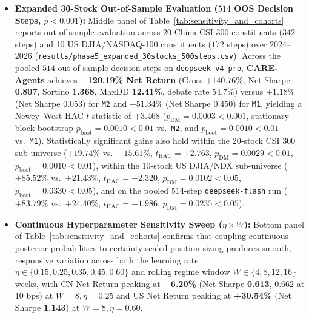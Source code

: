 \documentclass[10pt,a4paper,twocolumn]{article}
\begin{document}
\begin{itemize}
  \item \textbf{Expanded 30-Stock Out-of-Sample Evaluation ($514$ OOS Decision Steps, $p < 0.001$):} Middle panel of Table~\ref{tab:sensitivity_and_cohorts} reports out-of-sample evaluation across 20 China CSI 300 constituents ($342$ steps) and 10 US DJIA/NASDAQ-100 constituents ($172$ steps) over 2024--2026 (\texttt{results/phase5\_expanded\_30stocks\_500steps.csv}). Across the pooled $514$ out-of-sample decision steps on \texttt{deepseek-v4-pro}, \textbf{CARE-Agents} achieves \textbf{+120.19\% Net Return} (Gross $+140.76\%$, Net Sharpe \textbf{0.807}, Sortino \textbf{1.368}, MaxDD \textbf{12.41\%}, debate rate $54.7\%$) versus $+1.18\%$ (Net Sharpe $0.053$) for \texttt{M2} and $+51.34\%$ (Net Sharpe $0.450$) for \texttt{M1}, yielding a Newey--West HAC $t$-statistic of \textbf{$+3.468$} (\textbf{$p_{\text{DM}} = 0.0003 < 0.001$}, stationary block-bootstrap \textbf{$p_{\text{boot}} = 0.0010 < 0.01$} vs.\ \texttt{M2}, and \textbf{$p_{\text{boot}} = 0.0010 < 0.01$} vs.\ \texttt{M1}). Statistically significant gains also hold within the 20-stock CSI 300 sub-universe ($+19.74\%$ vs.\ $-15.61\%$, $t_{\text{HAC}} = +2.763$, $p_{\text{DM}} = 0.0029 < 0.01$, $p_{\text{boot}} = 0.0010 < 0.01$), within the 10-stock US DJIA/NDX sub-universe ($+85.52\%$ vs.\ $+21.43\%$, $t_{\text{HAC}} = +2.320$, $p_{\text{DM}} = 0.0102 < 0.05$, $p_{\text{boot}} = 0.0330 < 0.05$), and on the pooled $514$-step \texttt{deepseek-flash} run ($+83.79\%$ vs.\ $+24.40\%$, $t_{\text{HAC}} = +1.986$, $p_{\text{DM}} = 0.0235 < 0.05$).
  \item \textbf{Continuous Hyperparameter Sensitivity Sweep ($\eta \times W$):} Bottom panel of Table~\ref{tab:sensitivity_and_cohorts} confirms that coupling continuous posterior probabilities to certainty-scaled position sizing produces smooth, responsive variation across both the learning rate $\eta \in \{0.15, 0.25, 0.35, 0.45, 0.60\}$ and rolling regime window $W \in \{4, 8, 12, 16\}$ weeks, with CN Net Return peaking at \textbf{+6.20\%} (Net Sharpe \textbf{0.613}, $0.662$ at 10 bps) at $W=8, \eta=0.25$ and US Net Return peaking at \textbf{+30.54\%} (Net Sharpe \textbf{1.143}) at $W=8, \eta=0.60$.
\end{itemize}
\end{document}
